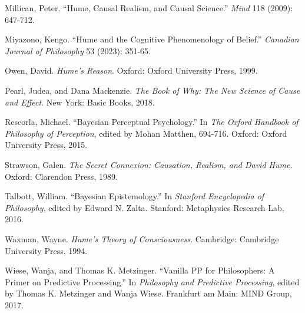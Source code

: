 \documentclass[11pt]{article}
\begin{document}
Millican, Peter. ``Hume, Causal Realism, and Causal Science.'' \emph{Mind} 118 (2009): 647-712.

Miyazono, Kengo. ``Hume and the Cognitive Phenomenology of Belief.'' \emph{Canadian Journal of Philosophy} 53 (2023): 351-65.

Owen, David. \emph{Hume's Reason}. Oxford: Oxford University Press, 1999.

Pearl, Judea, and Dana Mackenzie. \emph{The Book of Why: The New Science of Cause and Effect}. New York: Basic Books, 2018.

Rescorla, Michael. ``Bayesian Perceptual Psychology.'' In \emph{The Oxford Handbook of Philosophy of Perception}, edited by Mohan Matthen, 694-716. Oxford: Oxford University Press, 2015.

Strawson, Galen. \emph{The Secret Connexion: Causation, Realism, and David Hume}. Oxford: Clarendon Press, 1989.

Talbott, William. ``Bayesian Epistemology.'' In \emph{Stanford Encyclopedia of Philosophy}, edited by Edward N. Zalta. Stanford: Metaphysics Research Lab, 2016.

Waxman, Wayne. \emph{Hume's Theory of Consciousness}. Cambridge: Cambridge University Press, 1994.

Wiese, Wanja, and Thomas K. Metzinger. ``Vanilla PP for Philosophers: A Primer on Predictive Processing.'' In \emph{Philosophy and Predictive Processing}, edited by Thomas K. Metzinger and Wanja Wiese. Frankfurt am Main: MIND Group, 2017.
\end{document}
